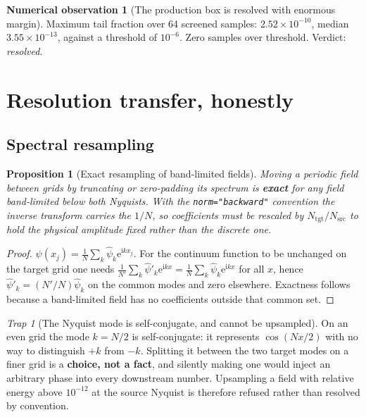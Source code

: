 \documentclass[11pt,a4paper]{article}
\theoremstyle{plain}
\newtheorem{proposition}[theorem]{Proposition}
\theoremstyle{definition}
\newtheorem{observation}[theorem]{Numerical observation}
\theoremstyle{remark}
\newtheorem{trap}[theorem]{Trap}
\newcommand{\iu}{\mathrm{i}}
\newcommand{\eu}{\mathrm{e}}
\newcommand{\code}[1]{\texttt{\small #1}}
\begin{document}
\begin{observation}[The production box is resolved with enormous margin]
Maximum tail fraction over 64 screened samples: $2.52\times10^{-10}$, median
$3.55\times10^{-13}$, against a threshold of $10^{-6}$. Zero samples over threshold.
Verdict: \emph{resolved}.
\end{observation}

\section{Resolution transfer, honestly}
\label{sec:resolution}

\subsection{Spectral resampling}

\begin{proposition}[Exact resampling of band-limited fields]
\label{prop:resample}
Moving a periodic field between grids by truncating or zero-padding its spectrum is
\textbf{exact} for any field band-limited below both Nyquists. With the
\code{norm="backward"} convention the inverse transform carries the $1/N$, so coefficients
must be rescaled by $N_{\mathrm{tgt}}/N_{\mathrm{src}}$ to hold the \emph{physical}
amplitude fixed rather than the discrete one.
\end{proposition}

\begin{proof}
$\psi(x_j) = \tfrac{1}{N}\sum_k\widehat\psi_k\eu^{\iu kx_j}$. For the continuum function to
be unchanged on the target grid one needs
$\tfrac{1}{N'}\sum_k \widehat\psi'_k\eu^{\iu kx} = \tfrac{1}{N}\sum_k\widehat\psi_k\eu^{\iu kx}$
for all $x$, hence $\widehat\psi'_k = (N'/N)\widehat\psi_k$ on the common modes and zero
elsewhere. Exactness follows because a band-limited field has no coefficients outside that
common set.
\end{proof}

\begin{trap}[The Nyquist mode is self-conjugate, and cannot be upsampled]
\label{trap:nyquist}
On an even grid the mode $k=N/2$ is self-conjugate: it represents $\cos(Nx/2)$ with no way
to distinguish $+k$ from $-k$. Splitting it between the two target modes on a finer grid
is a \textbf{choice, not a fact}, and silently making one would inject an arbitrary phase
into every downstream number. Upsampling a field with relative energy above $10^{-12}$ at
the source Nyquist is therefore refused rather than resolved by convention.
\end{trap}
\end{document}
